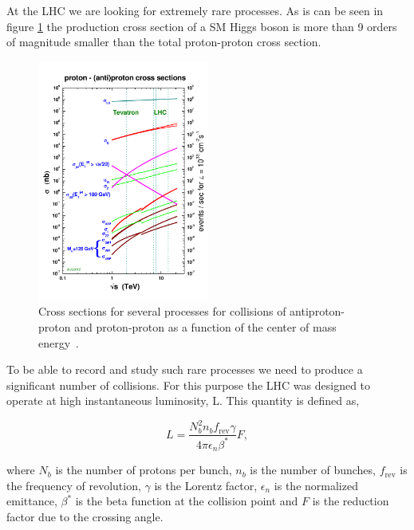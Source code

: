 

At the \gls{LHC} we are looking for extremely rare processes. As is can be seen in figure \ref{FIGURE:ExperimentalApparatus_LHCCrossSections} the production cross section of a \gls{SM} Higgs boson is more than 9 orders of magnitude smaller than the total proton-proton cross section. 

\begin{figure}[!htb]
  \centering
  \includegraphics[width=0.50\textwidth]{Chapter02/LHC/Images/crosssections2012_v5}
  \caption{Cross sections for several processes for collisions of antiproton-proton and proton-proton as a function of the center of mass energy~\cite{ARTICLE:TheCMSExperiment}.}
  \label{FIGURE:ExperimentalApparatus_LHCCrossSections}
\end{figure}

To be able to record and study such rare processes we need to produce a significant number of collisions. For this purpose the \gls{LHC} was designed to operate at high instantaneous luminosity, L. This quantity is defined as,

\begin{equation}
L=\frac{N_{b}^{2}n_{b}f_{\text{rev}}\gamma}{4\pi\epsilon_{n}\beta^{*}}F,
\end{equation}

where $N_{b}$ is the number of protons per bunch, $n_{b}$ is the number of bunches, $f_{\text{rev}}$ is the frequency of revolution, $\gamma$ is the Lorentz factor, $\epsilon_{n}$ is the normalized emittance, $\beta^{*}$ is the beta function at the collision point and $F$ is the reduction factor due to the crossing angle.

